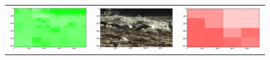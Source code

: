 \begin{figure}
\begin{tabular}{ccc}
\includegraphics[keepaspectratio=true,width=\segwidth]{images/segment/31_11__animals__.png} &
\includegraphics[keepaspectratio=true,width=\segwidth]{images/segment/31_11__image__.png} &
\includegraphics[keepaspectratio=true,width=\segwidth]{images/segment/31_11__plastic__.png} \\


\end{tabular}
\end{figure}
